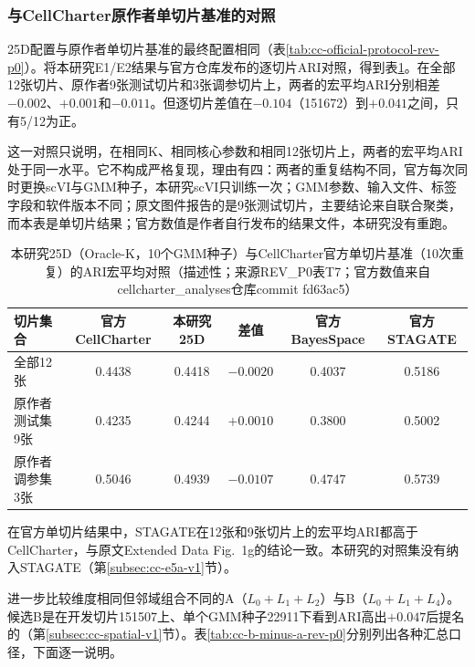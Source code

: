\subsubsection{与CellCharter原作者单切片基准的对照}
\label{subsubsec:cc-official-compare-rev-p0}
25D配置与原作者单切片基准的最终配置相同（表\ref{tab:cc-official-protocol-rev-p0}）。将本研究E1/E2结果与官方仓库发布的逐切片ARI\cite{cellcharteranalyses2024}对照，得到表\ref{tab:cc-official-compare-rev-p0}。在全部12张切片、原作者9张测试切片和3张调参切片上，两者的宏平均ARI分别相差$-0.002$、$+0.001$和$-0.011$。但逐切片差值在$-0.104$（151672）到$+0.041$之间，只有5/12为正。

这一对照只说明，在相同K、相同核心参数和相同12张切片上，两者的宏平均ARI处于同一水平。它不构成严格复现，理由有四：两者的重复结构不同，官方每次同时更换scVI与GMM种子，本研究scVI只训练一次；GMM参数、输入文件、标签字段和软件版本不同；原文图件报告的是9张测试切片，主要结论来自联合聚类，而本表是单切片结果；官方数值是作者自行发布的结果文件，本研究没有重跑。

\begin{table}[htbp]
\centering
\caption{本研究25D（Oracle-K，10个GMM种子）与CellCharter官方单切片基准（10次重复）的ARI宏平均对照（描述性；来源REV\_P0表T7；官方数值来自cellcharter\_analyses仓库commit fd63ac5）}
\label{tab:cc-official-compare-rev-p0}
\small
\begin{tabular}{lccccc}
\toprule
切片集合 & 官方CellCharter & 本研究25D & 差值 & 官方BayesSpace & 官方STAGATE\\
\midrule
全部12张 & 0.4438 & 0.4418 & $-0.0020$ & 0.4037 & 0.5186\\
原作者测试集9张 & 0.4235 & 0.4244 & $+0.0010$ & 0.3800 & 0.5002\\
原作者调参集3张 & 0.5046 & 0.4939 & $-0.0107$ & 0.4747 & 0.5739\\
\bottomrule
\end{tabular}
\end{table}

在官方单切片结果中，STAGATE在12张和9张切片上的宏平均ARI都高于CellCharter，与原文Extended Data Fig.~1g的结论一致。本研究的对照集没有纳入STAGATE（第\ref{subsec:cc-e5a-v1}节）。

进一步比较维度相同但邻域组合不同的A（$L_0+L_1+L_2$）与B（$L_0+L_1+L_4$）。候选B是在开发切片151507上、单个GMM种子22911下看到ARI高出$+0.047$后提名的（第\ref{subsec:cc-spatial-v1}节）。表\ref{tab:cc-b-minus-a-rev-p0}分别列出各种汇总口径，下面逐一说明。

